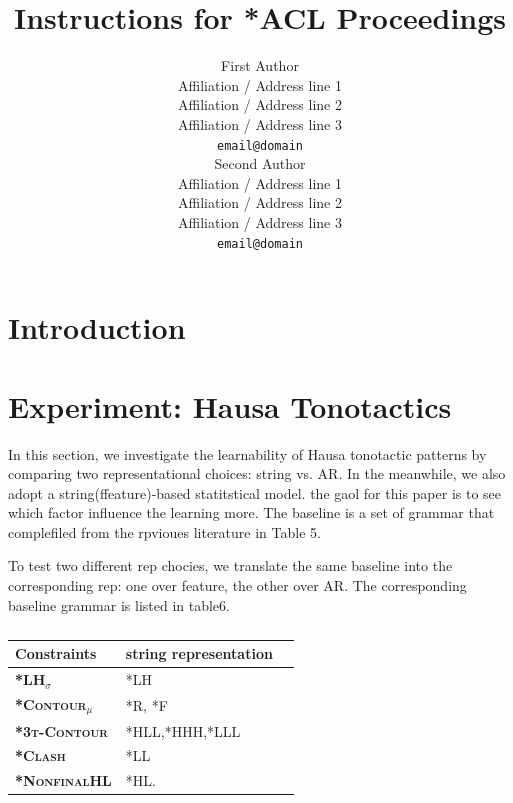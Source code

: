 \documentclass[11pt]{article}
\title{Instructions for *ACL Proceedings}
\author{First Author \\
  Affiliation / Address line 1 \\
  Affiliation / Address line 2 \\
  Affiliation / Address line 3 \\
  \texttt{email@domain} \\\And
  Second Author \\
  Affiliation / Address line 1 \\
  Affiliation / Address line 2 \\
  Affiliation / Address line 3 \\
  \texttt{email@domain} \\}
\begin{document}
\maketitle
\begin{abstract}

\end{abstract}

\section{Introduction}
\section{Experiment: Hausa Tonotactics}

In this section, we investigate the learnability of Hausa tonotactic patterns by comparing two representational choices: string vs. AR. In the meanwhile, we also adopt a string(ffeature)-based statitstical model. the gaol for this paper is to see which factor influence the learning more. The baseline is a set of grammar that complefiled from the rpvioues literature in Table 5. 

To test two different rep chocies, we translate the same baseline into the corresponding rep: one over feature, the other over AR. The corresponding baseline grammar is listed in table6.
\begin{table}[h]
  \begin{tabular}{lll}
                \hline
                \textbf{Constraints}& \textbf{string representation}\\
                \hline
                \textbf{\textsc{*LH}$_\sigma$}    & *LH \\
                \textbf{\textsc{*Contour}$_{\mu}$} & *R, *F\\
                \textbf{\textsc{*3t-Contour}}&*HLL,*HHH,*LLL\\
                \textbf{\textsc{*Clash}}& *LL\\
                \textbf{\textsc{*NonfinalHL}}& *HL.\\
                \hline
        \end{tabular}
        \vspace{-0.5em}\caption{}
        \vspace{-1.5em}
        \label{rules}
\end{table}
\end{document}
